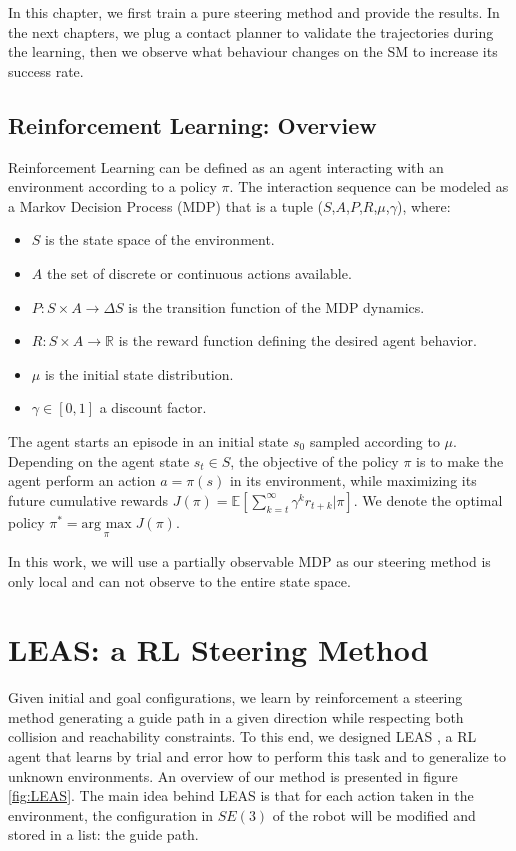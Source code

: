In this chapter, we first train a pure steering method and provide the results. 
In the next chapters, we plug a contact planner to validate the trajectories during the learning, then we observe what behaviour changes on the SM to increase its success rate.


\subsection{Reinforcement Learning: Overview}

Reinforcement Learning can be defined as an agent interacting with an environment according to a policy $\pi$. 
The interaction sequence can be modeled as a Markov Decision Process (MDP) that is a tuple ($S$,$A$,$P$,$R$,$\mu$,$\gamma$), where:
\begin{itemize}
    \item $S$ is the state space of the environment.
    \item $A$ the set of discrete or continuous actions available.
    \item $P: S \times A \rightarrow \Delta S$ is the transition function of the MDP dynamics.
    \item $R: S \times A \rightarrow \mathbb{R}$ is the reward function defining the desired agent behavior.
    \item $\mu$ is the initial state distribution.
    \item $\gamma \in [0,1]$ a discount factor.
\end{itemize}

The agent starts an episode in an initial state $s_0$ sampled according to $\mu$.
Depending on the agent state $s_t \in S$, the objective of the policy $\pi$ is to make the agent perform an action $a=\pi(s)$ in its environment, while maximizing its future cumulative rewards $J(\pi) = \mathbb{E}[\sum_{k=t}^{\infty} \gamma^k r_{t+k} | \pi]$.
We denote the optimal policy $\pi^* = \underset{\pi}{\mbox{arg max}} \; J(\pi)$.

In this work, we will use a partially observable MDP as our steering method is only local and can not observe to the entire state space.


\section{LEAS: a RL Steering Method\label{subsec:leas-RL}}
Given initial and goal configurations, we learn by reinforcement a steering method generating a guide path in a given direction while respecting both collision and reachability constraints. 
To this end, we designed LEAS \cite{LEAS}, a RL agent that learns by trial and error how to perform this task and to generalize to unknown environments. An overview of our method is presented in figure \ref{fig:LEAS}. The main idea behind LEAS is that for each action taken in the environment, the configuration in $SE(3)$ of the robot will be modified and stored in a list: the guide path.

